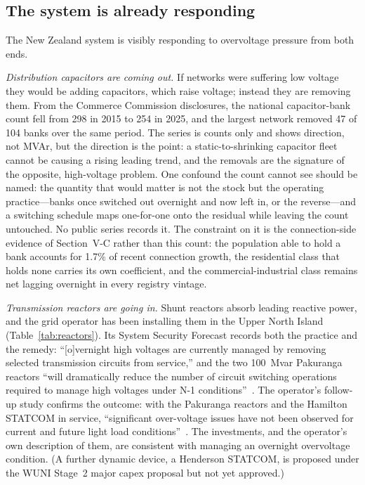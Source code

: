 \documentclass[journal]{IEEEtran}
\begin{document}
\subsection{The system is already responding}
The New Zealand system is visibly responding to overvoltage pressure from both
ends.

\emph{Distribution capacitors are coming out.} If networks were suffering low
voltage they would be adding capacitors, which raise voltage; instead they are
removing them. From the Commerce Commission disclosures, the
national capacitor-bank count fell from 298 in 2015 to 254 in 2025, and the largest
network removed 47 of 104 banks over the same period. The series is counts only and
shows direction, not MVAr, but the direction is the point: a static-to-shrinking
capacitor fleet cannot be causing a rising leading trend, and the removals are the
signature of the opposite, high-voltage problem. One confound the count cannot see
should be named: the quantity that would matter is not the stock but the operating
practice---banks once switched out overnight and now left in, or the reverse---and
a switching schedule maps one-for-one onto the residual while leaving the count
untouched. No public series records it. The constraint on it is the connection-side
evidence of Section~V-C rather than this count: the population able to hold a bank
accounts for 1.7\% of recent connection growth, the residential class that holds
none carries its own coefficient, and the commercial-industrial class remains net
lagging overnight in every registry vintage.

\emph{Transmission reactors are going in.} Shunt reactors absorb leading reactive
power, and the grid operator has been installing them in the Upper North Island
(Table~\ref{tab:reactors}). Its System Security Forecast records both the practice
and the remedy: ``[o]vernight high voltages are currently managed by removing
selected transmission circuits from service,'' and the two 100~Mvar Pakuranga
reactors ``will dramatically reduce the number of circuit switching operations
required to manage high voltages under N-1 conditions''~\cite{transpower_ssf2022}.
The operator's follow-up study confirms the outcome: with the Pakuranga reactors
and the Hamilton STATCOM in service, ``significant over-voltage issues have not
been observed for current and future light load conditions''~\cite{transpower_ssf2024n1}.
The investments, and the operator's own description of them, are consistent with
managing an overnight overvoltage condition. (A further dynamic device, a
Henderson STATCOM, is proposed under the WUNI Stage~2 major capex proposal but
not yet approved.)
\end{document}

